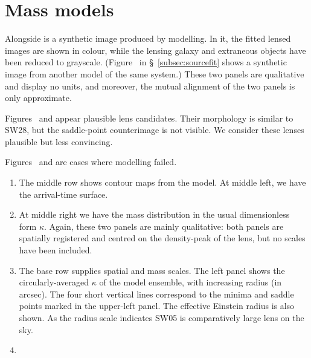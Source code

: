 \section{Mass models}

\begin{figure*}
\caption{\label{fig:arriv}}
\end{figure*}

\begin{figure*}
\label{fig:synth}
\caption{}
\end{figure*}

\begin{figure*}
\caption{\label{fig:kappa}}
\end{figure*}

\begin{figure*}
\caption{}
\end{figure*}

Alongside is a synthetic image produced by modelling.  In it, the
fitted lensed images are shown in colour, while the lensing galaxy and
extraneous objects have been reduced to grayscale.
(Figure~ in \S~\ref{subsec:sourcefit} shows a
synthetic image from another model of the same system.) These two
panels are qualitative and display no units, and moreover, the mutual
alignment of the two panels is only approximate.

Figures~ and  appear plausible lens
candidates.  Their morphology is similar to SW28, but the saddle-point
counterimage is not visible.  We consider these lenses plausible but
less convincing.

Figures~ and  are cases where modelling
failed.

\begin{enumerate}
\item The middle row shows contour maps from the model.  At middle
  left, we have the arrival-time surface.
\item At middle right we have the mass distribution in the usual
  dimensionless form $\kappa$.  Again, these two panels are mainly
  qualitative: both panels are spatially registered and centred on the
  density-peak of the lens, but no scales have been included.
\item The base row supplies spatial and mass scales.  The left panel
  shows the circularly-averaged $\kappa$ of the model ensemble, with
  increasing radius (in arcsec).  The four short vertical lines
  correspond to the minima and saddle points marked in the upper-left
  panel.  The effective Einstein radius \ER is also shown.  As the radius
  scale indicates SW05 is comparatively large lens on the
  sky.
\item 
\end{enumerate}

